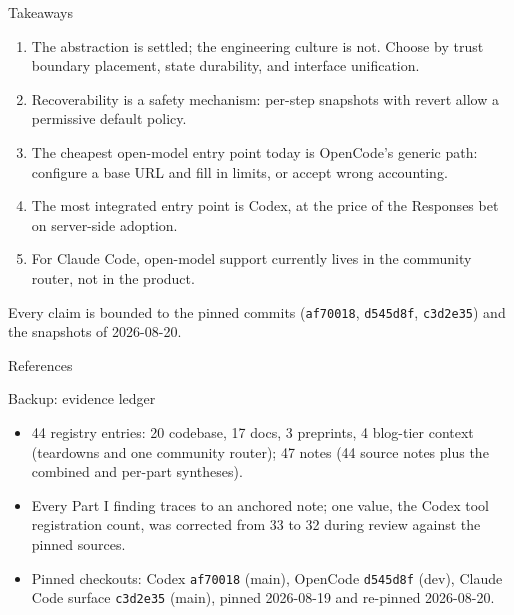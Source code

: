 \documentclass[aspectratio=169,11pt]{beamer}
\newcommand{\codex}[0]{Codex}
\newcommand{\occ}[0]{OpenCode}
\newcommand{\ccc}[0]{Claude Code}
\begin{document}
\begin{frame}{Takeaways}
  \begin{enumerate}
    \item The abstraction is settled; the engineering culture is not.
    Choose by trust boundary placement, state durability, and interface
    unification.
    \item Recoverability is a safety mechanism: per-step snapshots with
    revert allow a permissive default policy.
    \item The cheapest open-model entry point today is
    \textcolor{genericcol}{OpenCode's} generic path: configure a base URL
    and fill in limits, or accept wrong accounting.
    \item The most integrated entry point is \textcolor{nativecol}{Codex},
    at the price of the Responses bet on server-side adoption.
    \item For \textcolor{unattcol}{Claude Code}, open-model support
    currently lives in the community router, not in the product.
  \end{enumerate}

  \vspace{0.4em}
  Every claim is bounded to the pinned commits (\texttt{af70018},
  \texttt{d545d8f}, \texttt{c3d2e35}) and the snapshots of 2026-08-20.
\end{frame}

\begin{frame}[allowframebreaks]{References}
  \footnotesize
  
  
\end{frame}

\appendix

\begin{frame}{Backup: evidence ledger}
  \begin{itemize}
    \item 44 registry entries: 20 codebase, 17 docs, 3 preprints, 4
      blog-tier context (teardowns and one community router); 47 notes
      (44 source notes plus the combined and per-part syntheses).
    \item Every Part I finding traces to an anchored note; one value, the
      \codex{} tool registration count, was corrected from 33 to 32
      during review against the pinned sources.
    \item Pinned checkouts: \codex{} \texttt{af70018} (main), \occ{}
      \texttt{d545d8f} (dev), \ccc{} surface \texttt{c3d2e35} (main),
      pinned 2026-08-19 and re-pinned 2026-08-20.
  \end{itemize}
\end{frame}
\end{document}
